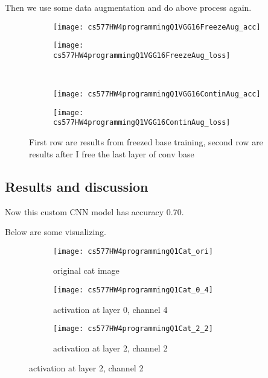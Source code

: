 \documentclass{article}
\begin{document}
Then we use some data augmentation and do above process again.
\begin{figure}[h!]
    \centering
    \begin{subfigure}{.40\textwidth}
        \centering
        \texttt{[image: cs577HW4programmingQ1VGG16FreezeAug\_acc]}
    \end{subfigure}
    \begin{subfigure}{.40\textwidth}
        \centering
        \texttt{[image: cs577HW4programmingQ1VGG16FreezeAug\_loss]}
    \end{subfigure}\\
    \begin{subfigure}{.40\textwidth}
        \centering
        \texttt{[image: cs577HW4programmingQ1VGG16ContinAug\_acc]}
    \end{subfigure}
    \begin{subfigure}{.40\textwidth}
        \centering
        \texttt{[image: cs577HW4programmingQ1VGG16ContinAug\_loss]}
    \end{subfigure}
    \caption{First row are results from freezed base training, second row are results after I free the last layer of conv base}
\end{figure}




\subsection*{Results and discussion}

Now this custom CNN model has accuracy 0.70.

Below are some visualizing.
\begin{figure}[h!]
    \centering
    \begin{subfigure}{.32\textwidth}
        \centering
        \texttt{[image: cs577HW4programmingQ1Cat\_ori]}
        \caption{original cat image}
    \end{subfigure}
    \begin{subfigure}{.32\textwidth}
        \centering
        \texttt{[image: cs577HW4programmingQ1Cat\_0\_4]}
        \caption{activation at layer 0, channel 4}
    \end{subfigure}
    \begin{subfigure}{.32\textwidth}
        \centering
        \texttt{[image: cs577HW4programmingQ1Cat\_2\_2]}
        \caption{activation at layer 2, channel 2}
    \end{subfigure}
\end{figure}
\end{document}
